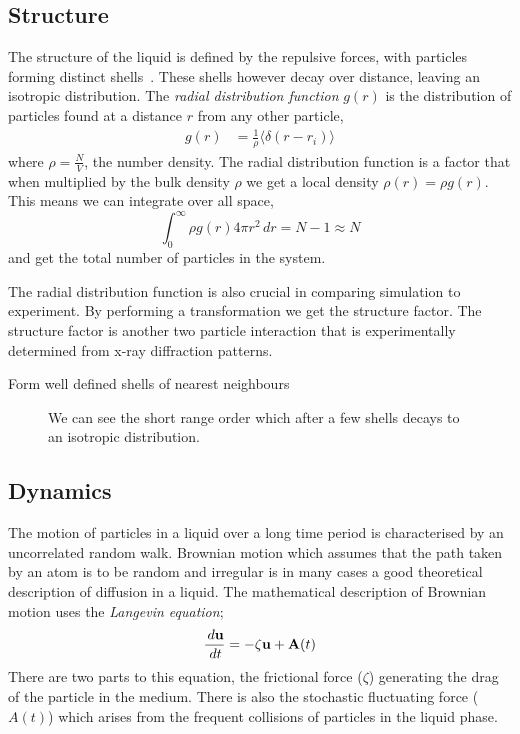 \subsection{Structure}
The structure of the liquid is defined by the repulsive forces, with particles forming distinct shells~. These shells however decay over distance, leaving an isotropic distribution. The \emph{radial distribution function} $g(r)$ is the distribution of particles found at a distance $r$ from any other particle,
\begin{align}
    g(r) &= \frac{1}{\rho} \langle \delta(r - r_i) \rangle
\end{align}
where $\rho = \frac{N}{V}$, the number density. The radial distribution function is a factor that when multiplied by the bulk density $\rho$ we get a local density $\rho(r) = \rho g(r)$. This means we can integrate over all space,
\begin{equation}
    \int_0^\infty \rho g(r) 4 \pi r^2\,dr = N-1 \approx N
\end{equation}
and get the total number of particles in the system.

The radial distribution function is also crucial in comparing simulation to experiment. By performing a transformation  we get the structure factor. The structure factor is another two particle interaction that is experimentally determined from x-ray diffraction patterns.

Form well defined shells of nearest neighbours~\cite[p2]{barrat:03}
\begin{figure}
    \label{fig:radial distribution}
    \caption{We can see the short range order which after a few shells decays to an isotropic distribution.}
\end{figure}

\subsection{Dynamics}
The motion of particles in a liquid over a long time period is characterised by an uncorrelated random walk. Brownian motion which assumes that the path taken by an atom is to be random and irregular is in many cases a good theoretical description of diffusion in a liquid. The mathematical description of Brownian motion uses the \emph{Langevin equation};
\begin{equation}
    \frac{\,d \mathbf{u}}{\,d t} = - \zeta \mathbf{u} + \mathbf{A}(t)
\end{equation}
There are two parts to this equation, the frictional force ($\zeta$) generating the drag of the particle in the medium. There is also the stochastic fluctuating force ($A(t)$) which arises from the frequent collisions of particles in the liquid phase.

